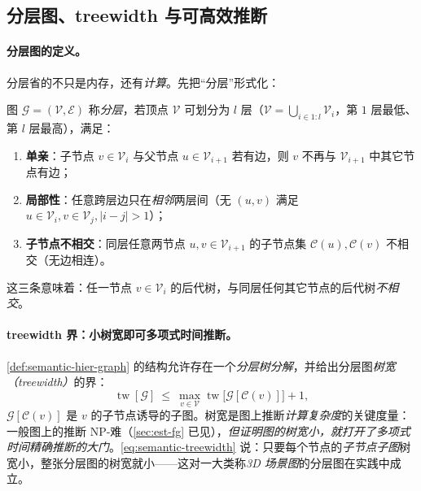 \subsection{分层图、treewidth 与可高效推断}
\label{sec:semantic-graph-tw}

\paragraph{分层图的定义。}
分层省的不只是内存，还有\emph{计算}。先把“分层”形式化\cite{hughes2022hydra}：

\begin{definition}[分层图]\label{def:semantic-hier-graph}
图 $\mathcal{G}=(\mathcal{V},\mathcal{E})$ 称\emph{分层}，若顶点 $\mathcal{V}$ 可划分为 $l$ 层（$\mathcal{V}=\bigcup_{i\in1:l}\mathcal{V}_i$，第 $1$ 层最低、第 $l$ 层最高），满足：
\begin{enumerate}
  \item \textbf{单亲}：子节点 $v\in\mathcal{V}_i$ 与父节点 $u\in\mathcal{V}_{i+1}$ 若有边，则 $v$ 不再与 $\mathcal{V}_{i+1}$ 中其它节点有边；
  \item \textbf{局部性}：任意跨层边只在\emph{相邻}两层间（无 $(u,v)$ 满足 $u\in\mathcal{V}_i,v\in\mathcal{V}_j,|i-j|>1$）；
  \item \textbf{子节点不相交}：同层任意两节点 $u,v\in\mathcal{V}_{i+1}$ 的子节点集 $\mathcal{C}(u),\mathcal{C}(v)$ 不相交（无边相连）。
\end{enumerate}
\end{definition}

这三条意味着：任一节点 $v\in\mathcal{V}_i$ 的后代树，与同层任何其它节点的后代树\emph{不相交}\cite{hughes2022hydra}。

\paragraph{treewidth 界：小树宽即可多项式时间推断。}
\cref{def:semantic-hier-graph} 的结构允许存在一个\emph{分层树分解}，并给出分层图\emph{树宽（treewidth）}的界\cite{hughes2022hydra}：
\begin{equation}
  \operatorname{tw}[\mathcal{G}]\ \le\ \max_{v\in\mathcal{V}}\operatorname{tw}\big[\mathcal{G}[\mathcal{C}(v)]\big]+1,
  \label{eq:semantic-treewidth}
\end{equation}
$\mathcal{G}[\mathcal{C}(v)]$ 是 $v$ 的子节点诱导的子图。树宽是图上推断\emph{计算复杂度}的关键度量\cite{koller2009pgm}：一般图上的推断 NP-难（\cref{sec:est-fg} 已见），\emph{但证明图的树宽小，就打开了多项式时间精确推断的大门}。\cref{eq:semantic-treewidth} 说：只要每个节点的\emph{子节点子图}树宽小，整张分层图的树宽就小——这对一大类称\emph{3D 场景图}的分层图在实践中成立\cite{hughes2022hydra}。

